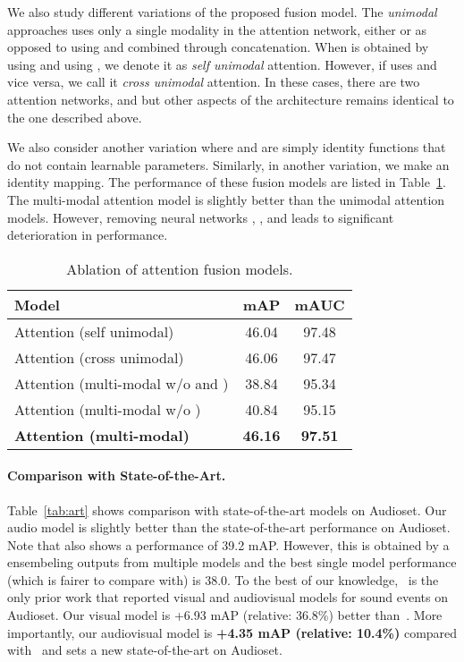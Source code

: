\documentclass{article}
\begin{document}
We also study different variations of the proposed fusion model.
The \emph{unimodal} approaches uses only a single modality in the attention network, either  or  as opposed to using  and  combined through concatenation.
When  is obtained by using  and  using , we denote it as \emph{self unimodal} attention.
However, if  uses  and vice versa, we call it \emph{cross unimodal} attention.
In these cases, there are two attention networks,  and  but other aspects of the architecture remains identical to the one described above.

We also consider another variation where  and  are simply identity functions that do not contain learnable parameters.
Similarly, in another variation, we make  an identity mapping.
The performance of these fusion models are listed in Table~\ref{tab:ablation}.
The multi-modal attention model is slightly better than the unimodal attention models.
However, removing neural networks , , and  leads to significant deterioration in performance.

\begin{table}[t]
	\centering
\begin{tabular}{l|c|c}
		\toprule
		Model                                       & mAP            & mAUC           \\
		\midrule
		Attention (self unimodal)                   & 46.04          & 97.48          \\
		Attention (cross unimodal)                  & 46.06          & 97.47          \\
		Attention (multi-modal w/o  and ) & 38.84          & 95.34          \\
		Attention (multi-modal w/o )        & 40.84          & 95.15          \\
		\textbf{Attention (multi-modal)}            & \textbf{46.16} & \textbf{97.51} \\
		\bottomrule
	\end{tabular}\caption{Ablation of attention fusion models.}\label{tab:ablation}
\end{table}

\paragraph{Comparison with State-of-the-Art.}
Table~\ref{tab:art} shows comparison with state-of-the-art models on Audioset.
Our audio model is slightly better than the state-of-the-art performance on Audioset. Note that \cite{ford2019deep} also shows a performance of 39.2 mAP. However, this is obtained by a ensembeling outputs from multiple models and the best single model performance (which is fairer to compare with) is 38.0. To the best of our knowledge,~\cite{Wang2019} is the only prior work that reported visual and audiovisual models for sound events on Audioset.
Our visual model is +6.93 mAP (relative: 36.8\%) better than~\cite{Wang2019}.
More importantly, our audiovisual model is \textbf{+4.35 mAP (relative: 10.4\%)} compared with~\cite{Wang2019} and sets a new state-of-the-art on Audioset.
\end{document}
